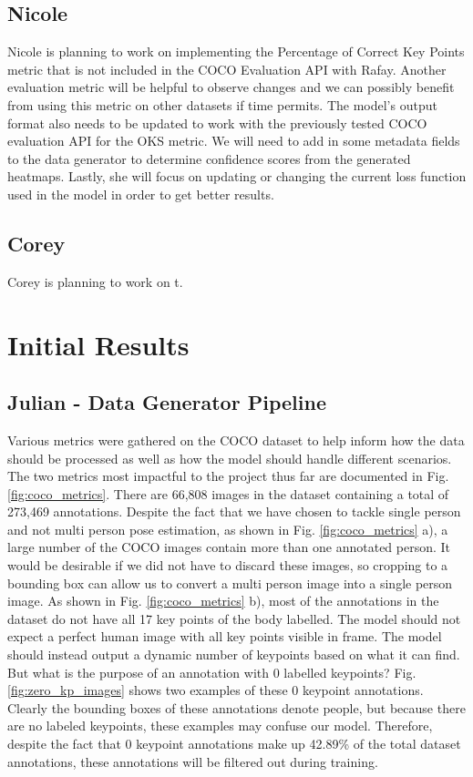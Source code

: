\documentclass[11pt, letterpaper]{article}
\begin{document}
\subsection{Nicole}
Nicole is planning to work on implementing the Percentage of Correct Key Points metric that is not included in the COCO Evaluation API with Rafay. Another evaluation metric will be helpful to observe changes and we can possibly benefit from using this metric on other datasets if time permits. The model’s output format also needs to be updated to work with the previously tested COCO evaluation API for the OKS metric. We will need to add in some metadata fields to the data generator to determine confidence scores from the generated heatmaps. Lastly, she will focus on updating or changing the current loss function used in the model in order to get better results.
\subsection{Corey}
Corey is planning to work on t. 

\section{Initial Results}
\label{SectionInitialResults}

\subsection{Julian - Data Generator Pipeline}

Various metrics were gathered on the COCO dataset to help inform how the data should be processed as well as how the model should handle different scenarios. The two metrics most impactful to the project thus far are documented in Fig. \ref{fig:coco_metrics}. There are 66,808 images in the dataset containing a total of 273,469 annotations. Despite the fact that we have chosen to tackle single person and not multi person pose estimation, as shown in Fig. \ref{fig:coco_metrics} a), a large number of the COCO images contain more than one annotated person. It would be desirable if we did not have to discard these images, so cropping to a bounding box can allow us to convert a multi person image into a single person image. As shown in Fig. \ref{fig:coco_metrics} b), most of the annotations in the dataset do not have all 17 key points of the body labelled. The model should not expect a perfect human image with all key points visible in frame. The model should instead output a dynamic number of keypoints based on what it can find. But what is the purpose of an annotation with 0 labelled keypoints? Fig. \ref{fig:zero_kp_images} shows two examples of these 0 keypoint annotations. Clearly the bounding boxes of these annotations denote people, but because there are no labeled keypoints, these examples may confuse our model. Therefore, despite the fact that 0 keypoint annotations make up 42.89\% of the total dataset annotations, these annotations will be filtered out during training.
\end{document}
